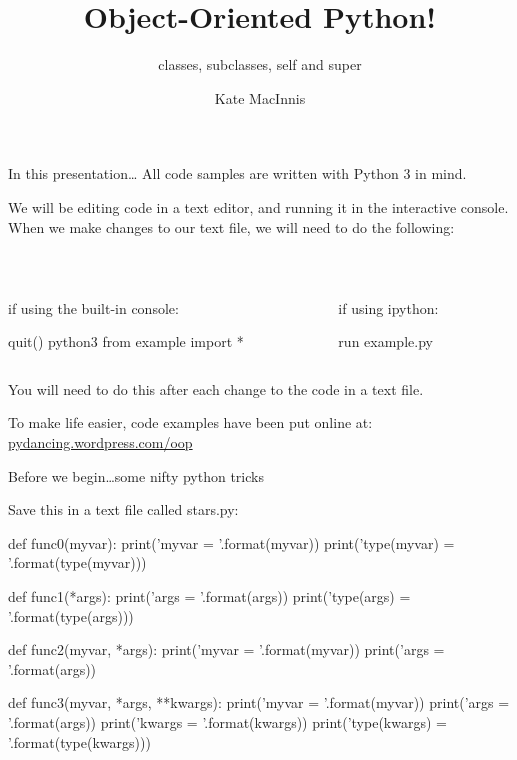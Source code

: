 \documentclass[aspectratio=149, handout] {beamer}
\title[OOP!]{Object-Oriented Python!}
\subtitle{classes, subclasses, self and super}
\author{Kate MacInnis}
\institute{PyLadies-ATX Tech Talk\\September 3, 2015}
\date{}
\begin{document}
\begin{frame}
\titlepage
\end{frame}


\begin{frame}[fragile]{In this presentation\dots}
  All code samples are written with Python 3 in mind.
  
  \bigskip
  
  
  We will be editing code in a text editor, and running it in the interactive console. When we make changes to our text file, we will need to do the following:
  
  ~\hfill
  \begin{columns}
    \begin{column}[t]{.4\textwidth}
      {\small if using the built-in console:}
      \begin{codeblock}
        quit()
        python3
        from example import *
      \end{codeblock}
    \end{column}
   
    \begin{column}[t]{.4\textwidth}
      {\small if using ipython:}
      \begin{codeblock}
        run example.py
      \end{codeblock}
    \end{column}
  \end{columns}
  
  \bigskip
  
  
  You will need to do this after each change to the code in a text file.
  
  To make life easier, code examples have been put online at:
  \url{pydancing.wordpress.com/oop}
  
\end{frame}



\begin{frame}[fragile]{Before we begin\dots some nifty python tricks}

  Save this in a text file called stars.py:
  
  \begin{smallpythoncode}
    def func0(myvar):
        print('myvar = {}'.format(myvar))
        print('type(myvar) = {}'.format(type(myvar)))
    
    def func1(*args):
        print('args = {}'.format(args))
        print('type(args) = {}'.format(type(args)))
    
    def func2(myvar, *args):
        print('myvar = {}'.format(myvar))
        print('args = {}'.format(args))
    
    def func3(myvar, *args, **kwargs):
        print('myvar = {}'.format(myvar))
        print('args = {}'.format(args))
        print('kwargs = {}'.format(kwargs))
        print('type(kwargs) = {}'.format(type(kwargs)))
  \end{smallpythoncode}


\end{frame}
\end{document}
